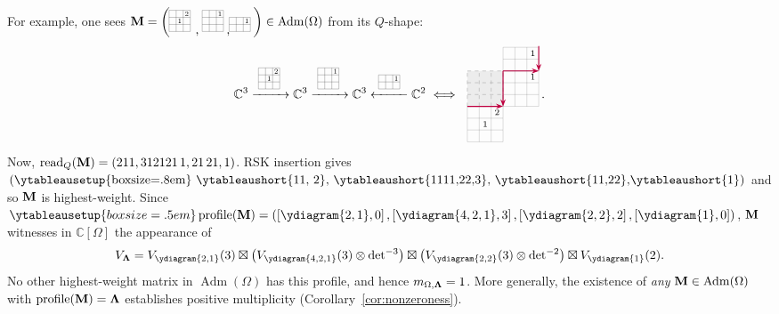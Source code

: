 \documentclass[12pt]{amsart}
\DeclareMathOperator{\Std}{\operatorname{Adm}}
\newcommand{\quivermatrix}[3]{
\scalebox{0.8}{
\begin{tikzpicture}[baseline=-0.5ex]
  \draw[line width=.2pt, step=.25cm] (0,0) grid (#1,#2);
  #3
\end{tikzpicture}
}
}
\newcommand{\cell}{.28}
\newcommand{\tile}[5]{%
\begin{scope}[shift={(#1,#2)}]
  \draw[line width =.1pt, step=\cell] (0,0) grid ({#3*\cell},{#4*\cell});
  #5
\end{scope}
}
\newcommand{\phantomtile}[5]{%
\begin{scope}[shift={(#1,#2)}]
  \fill[gray!15] (0,0) rectangle ({#3*\cell},{#4*\cell});
  \draw[gray!70, dashed, step=\cell] (0,0) grid ({#3*\cell},{#4*\cell});
  #5
\end{scope}
}
\newcommand{\numcell}[3]{%
  \node at ({(#1+.5)*\cell},{(2.5-#2)*\cell}) {\scriptsize $#3$};
}
\theoremstyle{definition}
\theoremstyle{remark}
\begin{document}
For example, one sees ${\bf M}=\left(\vcenter{\hbox{\!\!\!\!
\quivermatrix{.75}{.75}{
   \node at (.625,.625) {\scriptsize $2$};
  \node at (.375,.375) {\scriptsize $1$};
}\!\!, \!\!\!\!
\quivermatrix{.75}{.75}{
  \node at (.625,.625) {\scriptsize $1$};
} \!\!\!,\!\!\!\!
\quivermatrix{.75}{.5}{
  \node at (.625,.375) {\scriptsize $1$};
}}}\!\!\!
\right)\in \Std(\Omega)$ from its $Q$-shape:
\[
{\mathbb C}^3 
\xrightarrow{
\quivermatrix{.75}{.75}{
   \node at (.625,.625) {\scriptsize $2$};
  \node at (.375,.375) {\scriptsize $1$};
}}
 {\mathbb C}^3 \xrightarrow{
 \quivermatrix{.75}{.75}{
  \node at (.625,.625) {\scriptsize $1$};
}
 } {\mathbb C}^3
\xleftarrow{
\quivermatrix{.75}{.5}{
  \node at (.625,.375) {\scriptsize $1$};
}
} {\mathbb C}^2
\iff
\vcenter{\hbox{
\begin{tikzpicture}[scale=1.2, baseline=-.5ex]
\tile{0}{0}{3}{3}{
  \numcell{2}{0}{2}
  \numcell{1}{1}{1}
}

{\phantomtile{0}{.84}{3}{3}{
}}

\tile{.84}{.84}{3}{3}{
  \numcell{2}{0}{1}
}

\tile{.84}{1.68}{3}{2}{
  \numcell{2}{1}{1}
}

\draw[purple, -{Stealth[length=2mm,width=1.5mm]}, thick] (0,.84) -- (.84,.84);
\draw[purple, -{Stealth[length=2mm,width=1.5mm]}, thick] (.84,1.68) -- (.84,.84);
\draw[purple, -{Stealth[length=2mm,width=1.5mm]}, thick] (.84,1.68) -- (1.68,1.68);
\draw[purple, -{Stealth[length=2mm,width=1.5mm]}, thick] (1.68,2.27) -- (1.68,1.68);
\end{tikzpicture}}}.
\]
Now, $\operatorname{read}_Q({\bf M})= (211, 312121\,1, 21\, 21,1)$. 
RSK insertion gives $\left(\vcenter{\hbox{\ytableausetup{boxsize=.8em} \ytableaushort{11, 2},
\ytableaushort{1111,22,3}, \ytableaushort{11,22},\ytableaushort{1}}}\right)$
and so ${\bf M}$ is highest-weight. Since
$\ytableausetup{boxsize=.5em}\operatorname{profile}({\bf M})=
\left(\left[\vcenter{\hbox{$\ydiagram{2,1}$}},0\right], \left[\vcenter{\hbox{$\ydiagram{4,2,1}$}}, 3\right], 
\left[\vcenter{\hbox{$\ydiagram{2,2}$}}, 2\right], \left[\ydiagram{1},0\right] \right)$,
${\bf M}$ witnesses in ${\mathbb C}[\Omega]$ the appearance of
\[V_{\bf \Lambda}=V_{\ydiagram{2,1}}(3)\boxtimes \left(
V_{\ydiagram{4,2,1}}(3)\otimes \det\ \!\!\!^{-3}
\right)
\boxtimes \left(V_{\ydiagram{2,2}}(3) \otimes \det\ \!\!\!^{-2}\right)\boxtimes V_{\ydiagram{1}}(2).\]
No other highest-weight matrix in $\Std(\Omega)$ has this profile, and hence $m_{\Omega,{\bf \Lambda}}=1$. 
More generally, the existence of \emph{any} ${\bf M}\in \Std(\Omega)$ with $\operatorname{profile}({\bf M})={\bf \Lambda}$
establishes positive multiplicity (Corollary~\ref{cor:nonzeroness}).
\end{document}
